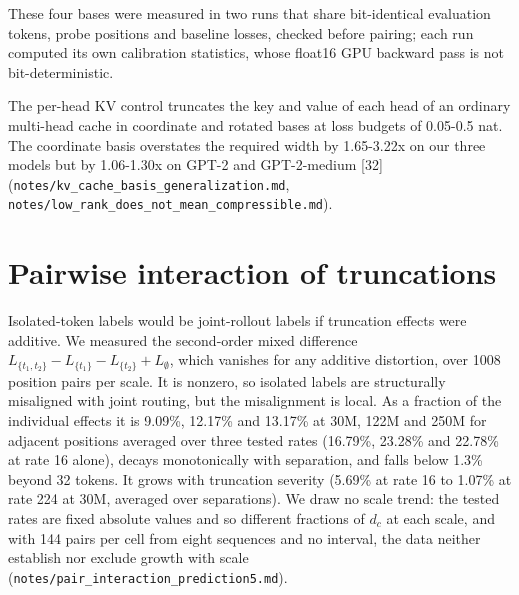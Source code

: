 \documentclass[10pt]{article}
\begin{document}
\begin{table}[t]
\centering
\caption{DeepSeek-V2-Lite: mean suffix-safe rate as a fraction of $d_c$ in the four bases.}
\end{table}

These four bases were measured in two runs that share bit-identical evaluation tokens, probe positions and baseline losses, checked before pairing; each run computed its own calibration statistics, whose float16 GPU backward pass is not bit-deterministic.

The per-head KV control truncates the key and value of each head of an ordinary multi-head cache in coordinate and rotated bases at loss budgets of 0.05-0.5 nat. The coordinate basis overstates the required width by 1.65-3.22x on our three models but by 1.06-1.30x on GPT-2 and GPT-2-medium [32] (\texttt{notes/\allowbreak kv\_cache\_basis\_generalization.md}, \texttt{notes/\allowbreak low\_rank\_does\_not\_mean\_compressible.md}).

\section{Pairwise interaction of truncations}

Isolated-token labels would be joint-rollout labels if truncation effects were additive. We measured the second-order mixed difference $L_{\{t_1,t_2\}}-L_{\{t_1\}}-L_{\{t_2\}}+L_{\emptyset}$, which vanishes for any additive distortion, over 1008 position pairs per scale. It is nonzero, so isolated labels are structurally misaligned with joint routing, but the misalignment is local. As a fraction of the individual effects it is 9.09\%, 12.17\% and 13.17\% at 30M, 122M and 250M for adjacent positions averaged over three tested rates (16.79\%, 23.28\% and 22.78\% at rate 16 alone), decays monotonically with separation, and falls below 1.3\% beyond 32 tokens. It grows with truncation severity (5.69\% at rate 16 to 1.07\% at rate 224 at 30M, averaged over separations). We draw no scale trend: the tested rates are fixed absolute values and so different fractions of $d_c$ at each scale, and with 144 pairs per cell from eight sequences and no interval, the data neither establish nor exclude growth with scale (\texttt{notes/\allowbreak pair\_interaction\_prediction5.md}).
\end{document}
